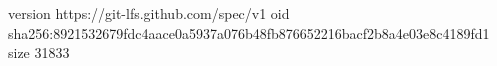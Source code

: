 version https://git-lfs.github.com/spec/v1
oid sha256:8921532679fdc4aace0a5937a076b48fb876652216bacf2b8a4e03e8c4189fd1
size 31833
